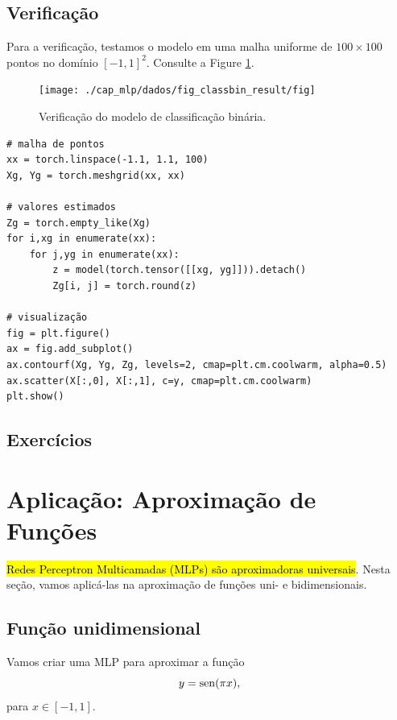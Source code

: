 \subsection{Verificação}
\badgeConstrucao

Para a verificação, testamos o modelo em uma malha uniforme de $100\times 100$ pontos no domínio $[-1, 1]^2$. Consulte a Figure \ref{cap_mlp_sec_classbin:fig:result}.

\begin{figure}[H]
  \centering
  \texttt{[image: ./cap\_mlp/dados/fig\_classbin\_result/fig]}
  \caption{Verificação do modelo de classificação binária.}
  \label{cap_mlp_sec_classbin:fig:result}
\end{figure}


\begin{lstlisting}
# malha de pontos
xx = torch.linspace(-1.1, 1.1, 100)
Xg, Yg = torch.meshgrid(xx, xx)

# valores estimados
Zg = torch.empty_like(Xg)
for i,xg in enumerate(xx):
    for j,yg in enumerate(xx):
        z = model(torch.tensor([[xg, yg]])).detach()
        Zg[i, j] = torch.round(z)

# visualização
fig = plt.figure()
ax = fig.add_subplot()
ax.contourf(Xg, Yg, Zg, levels=2, cmap=plt.cm.coolwarm, alpha=0.5)
ax.scatter(X[:,0], X[:,1], c=y, cmap=plt.cm.coolwarm)
plt.show()
\end{lstlisting}

\subsection{Exercícios}
\badgeConstrucao


\section{Aplicação: Aproximação de Funções}\label{cap_mlp_sec_apfun}

\hl{Redes Perceptron Multicamadas (MLPs) são aproximadoras universais}. Nesta seção, vamos aplicá-las na aproximação de funções uni- e bidimensionais.

\subsection{Função unidimensional}\label{mlp_apfun_1d}

Vamos criar uma MLP para aproximar a função
\begin{equation}
  y = \operatorname{sen}(\pi x),
\end{equation}
para $x\in [-1,1]$.


